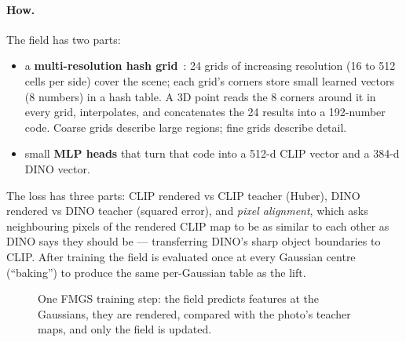 \documentclass[11pt,a4paper]{article}
\newcommand{\vect}[1]{\mathbf{#1}}
\begin{document}
\paragraph{How.} The field has two parts:
\begin{itemize}
  \item a \textbf{multi-resolution hash grid}~\cite{instantngp}: 24 grids of increasing resolution (16 to 512 cells per
        side) cover the scene; each grid's corners store small learned vectors (8 numbers) in a hash table. A 3D point
        reads the 8 corners around it in every grid, interpolates, and concatenates the 24 results into a 192-number
        code. Coarse grids describe large regions; fine grids describe detail.
  \item small \textbf{MLP heads} that turn that code into a 512-d CLIP vector and a 384-d DINO vector.
\end{itemize}
The loss has three parts: CLIP rendered vs CLIP teacher (Huber), DINO rendered vs DINO teacher (squared error), and
\emph{pixel alignment}, which asks neighbouring pixels of the rendered CLIP map to be as similar to each other as
DINO says they should be --- transferring DINO's sharp object boundaries to CLIP. After training the field is
evaluated once at every Gaussian centre (``baking'') to produce the same per-Gaussian table as the lift.

\begin{figure}[ht]
\centering
{}
\caption{One FMGS training step: the field predicts features at the Gaussians, they are rendered, compared with the
photo's teacher maps, and only the field is updated.}
\end{figure}
\end{document}
